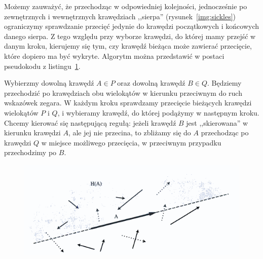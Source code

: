 Możemy zauważyć, że przechodząc w odpowiedniej kolejności,
jednocześnie po zewnętrznych i wewnętrznych krawędziach ,,sierpa''
(rysunek~\ref{img:sickles}) ograniczymy sprawdzanie przecięć jedynie
do krawędzi początkowych i końcowych danego sierpa. Z tego względu
przy wyborze krawędzi, do której mamy przejść w danym kroku, kierujemy
się tym, czy krawędź bieżąca może zawierać przecięcie, które dopiero
ma być wykryte. Algorytm można przedstawić w postaci pseudokodu z
listingu~\ref{alg:Orourke98}.

\begin{figure}[htp]

  \begin{algorithmic}[1]


    \Repeat

    \EndProcedure
  \end{algorithmic}
  \caption{\label{alg:Orourke98}}
\end{figure}

Wybierzmy dowolną krawędź $A \in P$ oraz dowolną krawędź $B \in
Q$. Będziemy przechodzić po krawędziach obu wielokątów w kierunku
przeciwnym do ruch wskazówek zegara. W każdym kroku sprawdzamy
przecięcie bieżących krawędzi wielokątów $P$ i $Q$, i wybieramy
krawędź, do której podążymy w następnym kroku.  Chcemy kierować się
następującą regułą: jeżeli krawędź $B$ jest ,,skierowana'' w kierunku
krawędzi $A$, ale jej nie przecina, to zbliżamy się do $A$ przechodząc
po krawędzi $Q$ w miejsce możliwego przecięcia, w przeciwnym przypadku
przechodzimy po $B$.

\begin{figure}[htb]
  \centering
  \includegraphics[scale=0.7]{img/vectors}
  \caption{\label{img:advance}}
\end{figure}

